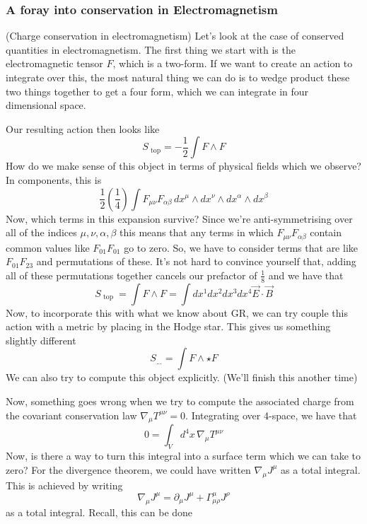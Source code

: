 \subsubsection{A foray into conservation in Electromagnetism} 
\begin{example}{(Charge conservation in electromagnetism)}
Let's look at the case of conserved 
quantities in electromagnetism. 
The first thing we start with is the electromagnetic 
tensor $ F $, which is a two-form. 
If we want to create an action to integrate over this, 
the most natural thing we can 
do is to wedge product these two things together 
to get a four form, which we can integrate in four dimensional 
space.

Our resulting action then looks like 
\[
S_{ \text{ top} }  =   - \frac{1}{2 } \int F \wedge F 
\] How do we make sense 
of this object in terms of physical fields which 
we observe? In components, this is 
\[
\frac{1}{2 } \left( \frac{1}{4 }  \right)  
\int F _{ \mu \nu} F_{ \alpha \beta } \,  dx^ \mu \wedge  dx ^ \nu \wedge  dx ^ \alpha \wedge  dx ^ \beta  
\] Now, which terms in this expansion survive? 
Since we're anti-symmetrising over all of the indices $ \mu, \nu , \alpha , \beta $ 
this means that any terms in which $ F _{ \mu \nu } F _{ \alpha \beta } $ 
contain common values like $ F _{ 01 } F _{ 0 1 } $ go to zero. 
So, we have to consider terms that are like $ F _{ 01 } F _{ 23 } $ 
and permutations of these. 
It's not hard to convince yourself that, adding all of these permutations
together cancels our prefactor of $ \frac{1}{8 } $ and we have that 
\[
S_{ \text{ top }  }  = \int F \wedge  F  = \int dx ^ 1 dx ^ 2 dx ^ 3 dx ^ 4 \vec{E} \cdot  \vec{B}
\]
Now, to incorporate this with what we know 
about GR, we can try couple this 
action with a metric by placing in the Hodge star. 
This gives us something slightly different 
\[
S_{ \text{...} }  = \int F \wedge  \star F  
\] We can also try to compute this object explicitly. 
(We'll finish this another time)
\end{example}

Now, something goes wrong when we 
try to compute the associated charge from 
the covariant conservation law $ \nabla _ \mu T ^{ \mu \nu }  = 0$. 
Integrating over 4-space, we have that 
\[
0 = \int _ V d ^ 4 x \, \nabla _ \mu T ^{ \mu \nu } 
\] Now, is there a way to turn this integral 
into a surface term which we can take to zero?
For the divergence theorem, we could have written 
$ \nabla _ \mu J ^ \mu $ as a total integral. 
This is achieved by writing 
\[
\nabla _ \mu J ^ \mu  = \partial  _ \mu J ^ \mu + \Gamma^ \mu _{ \mu \rho } J ^ \rho 
\] as a total integral. 
Recall, this can be done 

